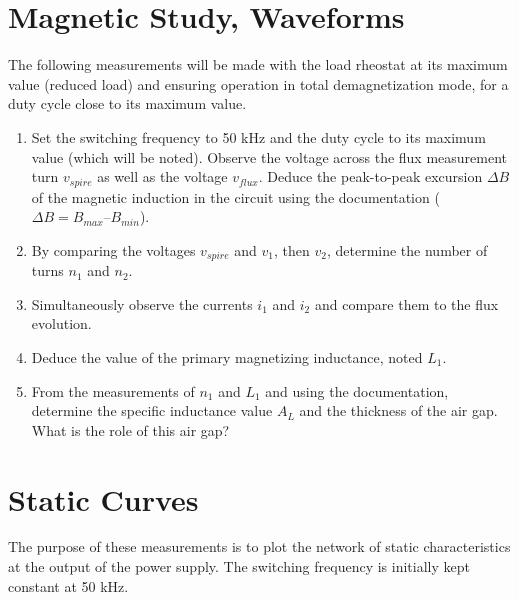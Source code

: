 \section{Magnetic Study, Waveforms}

The following measurements will be made with the load rheostat at its maximum value (reduced load) and ensuring operation in total demagnetization mode, for a duty cycle close to its maximum value.

\begin{enumerate}
\item Set the switching frequency to 50 kHz and the duty cycle to its maximum value (which will be noted). Observe the voltage across the flux measurement turn $v_{spire}$ as well as the voltage $v_{flux}$. Deduce the peak-to-peak excursion $\Delta B$ of the magnetic induction in the circuit using the documentation ($\Delta B = B_{max} – B_{min}$).
\item By comparing the voltages $v_{spire}$ and $v_1$, then $v_2$, determine the number of turns $n_1$ and $n_2$.
\item Simultaneously observe the currents $i_1$ and $i_2$ and compare them to the flux evolution.
\item Deduce the value of the primary magnetizing inductance, noted $L_1$.
\item From the measurements of $n_1$ and $L_1$ and using the documentation, determine the specific inductance value $A_L$ and the thickness of the air gap. What is the role of this air gap?
\end{enumerate}

\newpage
\section{Static Curves}

The purpose of these measurements is to plot the network of static characteristics at the output of the power supply. The switching frequency is initially kept constant at 50 kHz.

